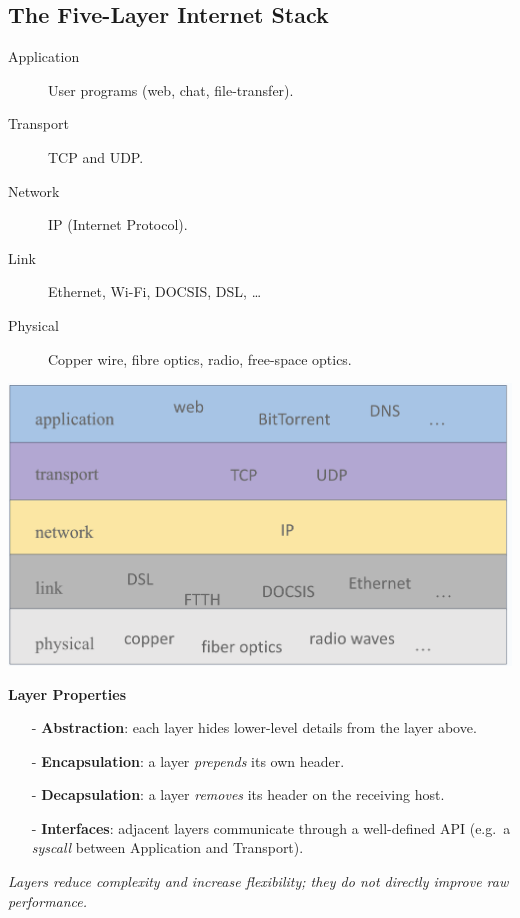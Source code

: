 \documentclass[../../compsys.tex]{subfiles}
\begin{document}
\subsection{The Five-Layer Internet Stack}

\begin{description}
  \item[Application] User programs (web, chat, file-transfer).
  \item[Transport] TCP and UDP.
  \item[Network] IP (Internet Protocol).
  \item[Link] Ethernet, Wi-Fi, DOCSIS, DSL, \dots
  \item[Physical] Copper wire, fibre optics, radio, free-space optics.
\end{description}
\begin{minipage}[htp]{0.45\textwidth}
\begin{center}
  \includegraphics[width=1\textwidth]{images/nic-tech.png}
\end{center}
\end{minipage}
\begin{minipage}[htp]{0.45\textwidth}
\textbf{Layer Properties}
\begin{itemize}
  \item[-] \textbf{Abstraction}: each layer hides lower-level details from
        the layer above.
  \item[-] \textbf{Encapsulation}: a layer \emph{prepends} its own header.
  \item[-] \textbf{Decapsulation}: a layer \emph{removes} its header on the
        receiving host.
  \item[-] \textbf{Interfaces}: adjacent layers communicate through a
        well-defined API (e.g.\ a \emph{syscall} between Application and
        Transport).
\end{itemize}
\emph{Layers reduce complexity and increase flexibility; they do not
directly improve raw performance.}
\end{minipage}
\end{document}
